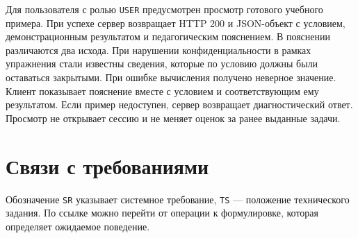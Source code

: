 \documentclass[12pt,a4paper]{article}
\begin{document}
\hypertarget{учебная-демонстрация-со-скрытым-свойством}{}

Для пользователя с ролью \texttt{USER} предусмотрен просмотр готового учебного примера. При успехе сервер возвращает HTTP 200 и JSON-объект с условием, демонстрационным результатом и педагогическим пояснением. В пояснении различаются два исхода. При нарушении конфиденциальности в рамках упражнения стали известны сведения, которые по условию должны были оставаться закрытыми. При ошибке вычисления получено неверное значение. Клиент показывает пояснение вместе с условием и соответствующим ему результатом. Если пример недоступен, сервер возвращает диагностический ответ. Просмотр не открывает сессию и не меняет оценок за ранее выданные задачи.

\section{Связи с требованиями}\label{ux441ux432ux44fux437ux438-ux441-ux442ux440ux435ux431ux43eux432ux430ux43dux438ux44fux43cux438}

\hypertarget{связи-с-требованиями}{}

Обозначение \texttt{SR} указывает системное требование, \texttt{TS} --- положение технического задания. По ссылке можно перейти от операции к формулировке, которая определяет ожидаемое поведение.
\end{document}
